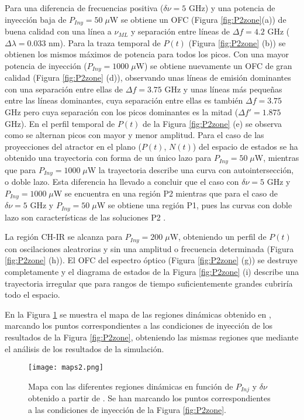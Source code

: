 		Para una diferencia de frecuencias positiva ($\delta \nu = 5$ GHz) y una potencia de inyecci\'on baja de $P_{Iny} = 50\;\mu$W se obtiene un OFC (Figura \ref{fig:P2zone}(a)) de buena calidad con una l\'inea a $\nu_{ML}$ y separaci\'on entre l\'ineas de $\Delta f = 4.2$ GHz ($\Delta \lambda = 0.033$ nm). Para la traza temporal de $P(t)$ (Figura \ref{fig:P2zone} (b)) se obtienen los mismos m\'aximos de potencia para todos los picos. Con una mayor potencia de inyecci\'on ($P_{Iny} = 1000\;\mu$W) se obtiene nuevamente un OFC de gran calidad (Figura \ref{fig:P2zone} (d)), observando unas l\'ineas de emisi\'on dominantes con una separaci\'on entre ellas de $\Delta f = 3.75$ GHz y unas l\'ineas m\'as pequeñas entre las l\'ineas dominantes, cuya separaci\'on entre ellas es tambi\'en $\Delta f = 3.75$ GHz pero cuya separaci\'on con los picos dominantes es la mitad ($\Delta f' = 1.875$ GHz). En el perfil temporal de $P(t)$ de la Figura \ref{fig:P2zone} (e) se observa como se alternan picos con mayor y menor amplitud. Para el caso de las proyecciones del atractor en el plano ($P(t)$, $N(t)$) del espacio de estados se ha obtenido una trayectoria con forma de un \'unico lazo para $P_{Iny} = 50\;\mu$W, mientras que para $P_{Iny} = 1000\;\mu$W la trayectoria describe una curva con autointersección, o doble lazo. Esta diferencia ha llevado a concluir que el caso con $\delta\nu = 5$ GHz y $P_{Iny} = 1000\;\mu$W se encuentra en una regi\'on P2 mientras que para el caso de $\delta\nu = 5$ GHz y $P_{Iny} = 50\;\mu$W se obtiene una regi\'on P1, pues las curvas con doble lazo son características de las soluciones P2 \cite{sconza2005torsion}.

		La región CH-IR se alcanza para $P_{Iny} = 200\;\mu$W, obteniendo un perfil de $P(t)$ con oscilaciones aleatrorias y sin una amplitud o frecuencia determinada (Figura \ref{fig:P2zone} (h)). El OFC del espectro óptico (Figura \ref{fig:P2zone} (g)) se destruye completamente y el diagrama de estados de la Figura \ref{fig:P2zone} (i) describe una trayectoria irregular que para rangos de tiempo suficientemente grandes cubriría todo el espacio. 

		En la Figura \ref{fig:maps2} se muestra el mapa de las regiones dinámicas obtenido en \cite{Chaves19}, marcando los puntos correspondientes a las condiciones de inyección de los resultados de la Figura \ref{fig:P2zone}, obteniendo las mismas regiones que mediante el análisis de los resultados de la simulación.

			\begin{figure}[H]
				\centering
				\texttt{[image: maps2.png]}
				\caption{\label{fig:maps2}Mapa con las diferentes regiones dinámicas en función de $P_{Inj}$ y $\delta\nu$ obtenido a partir de \cite{Chaves19}. Se han marcando los puntos correspondientes a las condiciones de inyección de la Figura \ref{fig:P2zone}.}	
			\end{figure}
